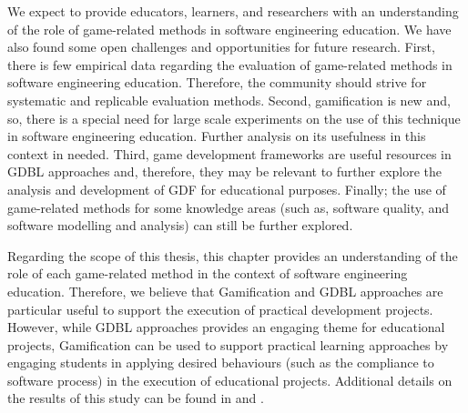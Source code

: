 We expect to provide educators, learners, and researchers with an understanding of the role of game-related methods in software engineering education. We have also found some open challenges and opportunities for future research. First, there is few empirical data regarding the evaluation of game-related methods in software engineering education. Therefore, the community should strive for systematic and replicable evaluation methods. Second, gamification is new and, so, there is a special need for large scale experiments on the use of this technique in software engineering education. Further analysis on its usefulness in this context in needed. Third, game development frameworks are useful resources in GDBL approaches and, therefore, they may be relevant to further explore the analysis and development of GDF for educational purposes. Finally; the use of game-related methods for some knowledge areas (such as, software quality, and software modelling and analysis) can still be further explored.

Regarding the scope of this thesis, this chapter provides an understanding of the role of each game-related method in the context of software engineering education. Therefore, we believe that Gamification and GDBL approaches are particular useful to support the execution of practical development projects. However, while GDBL approaches provides an engaging theme for educational projects, Gamification can be used to support practical learning approaches by engaging students in applying desired behaviours (such as the compliance to software process) in the execution of educational projects. Additional details on the results of this study can be found in \cite{Souza:2017b} and \cite{Souza:2018}.

